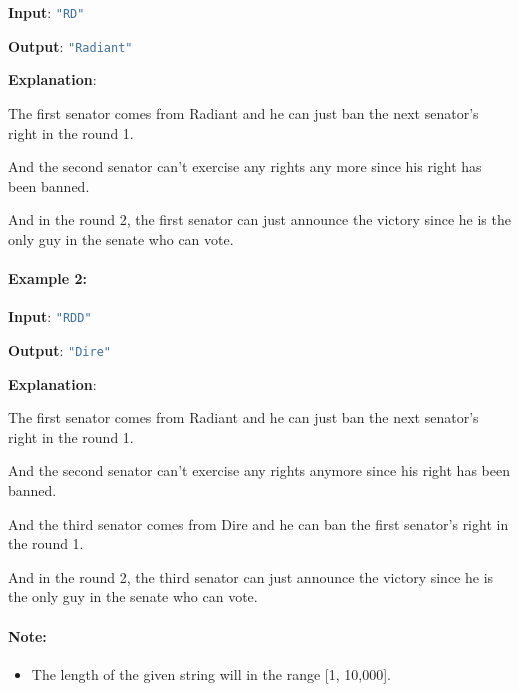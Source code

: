 \begin{flushleft}
\textbf{Input}: \lstinline[language=Java, basicstyle=\small\ttfamily, keywordstyle=\bfseries\color{green!40!black}]|"RD"|

\textbf{Output}: \lstinline[language=Java, basicstyle=\small\ttfamily, keywordstyle=\bfseries\color{green!40!black}]|"Radiant"|

\textbf{Explanation}: 

The first senator comes from Radiant and he can just ban the next senator's right in the round 1. 

And the second senator can't exercise any rights any more since his right has been banned. 

And in the round 2, the first senator can just announce the victory since he is the only guy in the senate who can vote.
\end{flushleft}


\paragraph{Example 2:}

\begin{flushleft}
\textbf{Input}: \lstinline[language=Java, basicstyle=\small\ttfamily, keywordstyle=\bfseries\color{green!40!black}]|"RDD"|

\textbf{Output}: \lstinline[language=Java, basicstyle=\small\ttfamily, keywordstyle=\bfseries\color{green!40!black}]|"Dire"|

\textbf{Explanation}: 

The first senator comes from Radiant and he can just ban the next senator's right in the round 1. 

And the second senator can't exercise any rights anymore since his right has been banned. 

And the third senator comes from Dire and he can ban the first senator's right in the round 1. 

And in the round 2, the third senator can just announce the victory since he is the only guy in the senate who can vote.
\end{flushleft}

\paragraph{Note:}

\begin{itemize}
\item     The length of the given string will in the range [1, 10,000].
\end{itemize}

